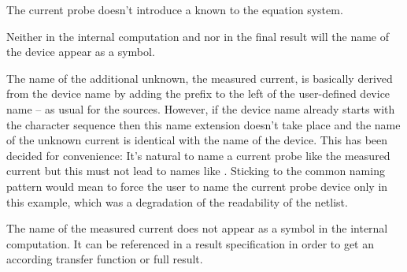 The current probe doesn't introduce a known to the equation system.

Neither in the internal computation and nor in the final result will the
name of the device appear as a symbol.

The name of the additional unknown, the measured current, is basically
derived from the device name by adding the prefix  to the left
of the user-defined device name -- as usual for the sources. However, if
the device name already starts with the character sequence  then
this name extension doesn't take place and the name of the unknown current
is identical with the name of the device. This has been decided for
convenience: It's natural to name a current probe like the measured
current but this must not lead to names like .
Sticking to the common naming pattern would mean to force the user to name
the current probe device only  in this example, which was
a degradation of the readability of the netlist.

The name of the measured current does not appear as a symbol in the
internal computation. It can be referenced in a result specification in
order to get an according transfer function or full result.

